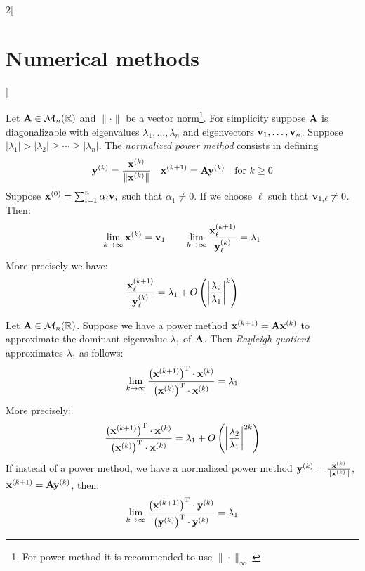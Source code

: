 \documentclass[../../../main.tex]{subfiles}
\begin{document}
\begin{multicols}{2}[\section{Numerical methods}]
\begin{method}
\end{method}
\begin{method}
    Let $\vb{A}\in\mathcal{M}_n(\mathbb{R})$ and $\|\cdot\|$ be a vector norm\footnote{For power method it is recommended to use $\|\cdot\|_\infty$.}. For simplicity suppose $\vb{A}$ is diagonalizable with eigenvalues $\lambda_1,\ldots,\lambda_n$ and eigenvectors $\vb{v}_1,\ldots,\vb{v}_n$. Suppose $|\lambda_1|>|\lambda_2|\geq\cdots\geq|\lambda_n|$. The \textit{normalized power method} consists in defining $$\vb{y}^{(k)}=\frac{\vb{x}^{(k)}}{\|\vb{x}^{(k)}\|}\quad\vb{x}^{(k+1)}=\vb{A}\vb{y}^{(k)}\quad\text{for }k\geq 0$$ Suppose $\vb{x}^{(0)}=\sum_{i=1}^n\alpha_i\vb{v}_i$ such that $\alpha_1\ne0$. If we choose $\ell$ such that $\vb{v}_{1,\ell}\ne0$. Then: $$\lim_{k\to\infty}\vb{x}^{(k)}=\vb{v}_1\qquad\lim_{k\to\infty}\frac{\vb{x}_\ell^{(k+1)}}{\vb{y}_\ell^{(k)}}=\lambda_1$$ More precisely we have: $$\frac{\vb{x}_\ell^{(k+1)}}{\vb{y}_\ell^{(k)}}=\lambda_1+O\left(\left|\frac{\lambda_2}{\lambda_1}\right|^k\right)$$
\end{method}
\begin{method}
    Let $\vb{A}\in\mathcal{M}_n(\mathbb{R})$. Suppose we have a power method $\vb{x}^{(k+1)}=\vb{A}\vb{x}^{(k)}$ to approximate the dominant eigenvalue $\lambda_1$ of $\vb{A}$. Then \textit{Rayleigh quotient} approximates $\lambda_1$ as follows: $$\lim_{k\to\infty}\frac{\left(\vb{x}^{(k+1)}\right)^\mathrm{T}\cdot \vb{x}^{(k)}}{\left(\vb{x}^{(k)}\right)^\mathrm{T}\cdot\vb{x}^{(k)}}=\lambda_1$$
    More precisely: $$\frac{\left(\vb{x}^{(k+1)}\right)^\mathrm{T}\cdot \vb{x}^{(k)}}{\left(\vb{x}^{(k)}\right)^\mathrm{T}\cdot\vb{x}^{(k)}}=\lambda_1+O\left(\left|\frac{\lambda_2}{\lambda_1}\right|^{2k}\right)$$ If instead of a power method, we have a normalized power method $\vb{y}^{(k)}=\frac{\vb{x}^{(k)}}{\|\vb{x}^{(k)}\|}$, $\vb{x}^{(k+1)}=\vb{A}\vb{y}^{(k)}$, then: $$\lim_{k\to\infty}\frac{\left(\vb{x}^{(k+1)}\right)^\mathrm{T}\cdot \vb{y}^{(k)}}{\left(\vb{y}^{(k)}\right)^\mathrm{T}\cdot\vb{y}^{(k)}}=\lambda_1$$
\end{method}
\begin{method}

\end{method}
\end{multicols}
\end{document}
